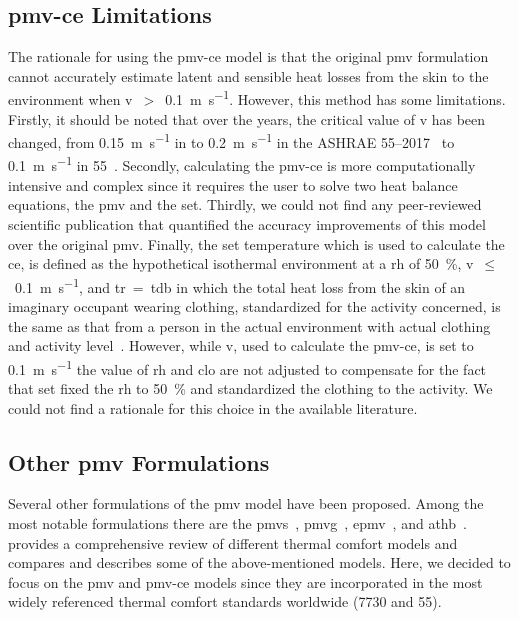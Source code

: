 \subsection{\ac{pmv-ce} Limitations}\label{subsec:pmv-ce-limitations}
The rationale for using the \ac{pmv-ce} model is that the original \ac{pmv} formulation cannot accurately estimate latent and sensible heat losses from the skin to the environment when \ac{v}~$>$~\qty{0.1}{\m\per\s}.
However, this method has some limitations.
Firstly, it should be noted that over the years, the critical value of \ac{v} has been changed, from \qty{0.15}{\m\per\s} in  to \qty{0.2}{\m\per\s} in the ASHRAE 55--2017~\cite{ASHRAE552017, arens_moving_2009} to \qty{0.1}{\m\per\s} in \gls{55}~\cite{ashrae552023}.
Secondly, calculating the \ac{pmv-ce} is more computationally intensive and complex since it requires the user to solve two heat balance equations, the \ac{pmv} and the \ac{set}.
Thirdly, we could not find any peer-reviewed scientific publication that quantified the accuracy improvements of this model over the original \ac{pmv}.
Finally, the \ac{set} temperature which is used to calculate the \ac{ce}, is defined as the hypothetical isothermal environment at a \ac{rh} of \qty{50}{\percent}, \ac{v}~$\leq$~\qty{0.1}{\m\per\s}, and \ac{tr}~=~\ac{tdb} in which the total heat loss from the skin of an imaginary occupant wearing clothing, standardized for the activity concerned, is the same as that from a person in the actual environment with actual clothing and activity level~\cite{ashrae552023}.
However, while \ac{v}, used to calculate the \ac{pmv-ce}, is set to \qty{0.1}{\m\per\s} the value of \ac{rh} and \ac{clo} are not adjusted to compensate for the fact that \ac{set} fixed the \ac{rh} to \qty{50}{\percent} and standardized the clothing to the activity.
We could not find a rationale for this choice in the available literature.

\subsection{Other \ac{pmv} Formulations}\label{subsec:other-pmv-formulations}
Several other formulations of the \ac{pmv} model have been proposed.
Among the most notable formulations there are the \ac{pmvs}~\cite{GaggeSET}, \ac{pmvg}~\cite{GaggeSET}, \ac{epmv}~\cite{Toftum2002}, and \ac{athb}~\cite{Schweiker2022}.
 provides a comprehensive review of different thermal comfort models and compares and describes some of the above-mentioned models.
Here, we decided to focus on the \ac{pmv} and \ac{pmv-ce} models since they are incorporated in the most widely referenced thermal comfort standards worldwide (\gls{7730} and \gls{55}).

